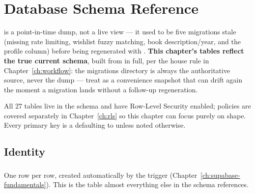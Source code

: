 \chapter{Database Schema Reference}
\label{ch:schema}

\begin{olknote}
 is a point-in-time dump, not a live view — it used to be five migrations stale (missing rate limiting, wishlist fuzzy matching, book description/year, and the profile  column) before being regenerated with . \textbf{This chapter's tables reflect the true current schema}, built from  in full, per the house rule in Chapter~\ref{ch:workflow}: the migrations directory is always the authoritative source, never the dump — treat  as a convenience snapshot that can drift again the moment a migration lands without a follow-up regeneration.
\end{olknote}

All 27 tables live in the  schema and have Row-Level Security enabled; policies are covered separately in Chapter~\ref{ch:rls} so this chapter can focus purely on shape. Every primary key is a  defaulting to  unless noted otherwise.

\section{Identity}

\subsection*{}
One row per  row, created automatically by the  trigger (Chapter~\ref{ch:supabase-fundamentals}). This is the table almost everything else in the schema references.

